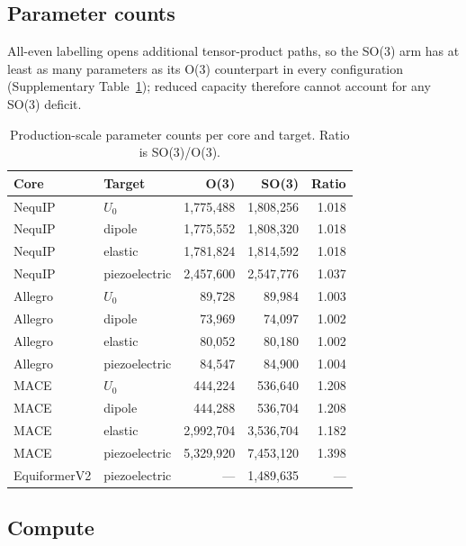 \subsection*{Parameter counts}

All-even labelling opens additional tensor-product paths, so the SO(3) arm has at least as many parameters as its O(3) counterpart in every configuration (Supplementary Table~\ref{stab:params}); reduced capacity therefore cannot account for any SO(3) deficit.

\begin{table}[htbp]
\centering
\caption{Production-scale parameter counts per core and target. Ratio is SO(3)/O(3).}
\label{stab:params}
\scriptsize
\begin{tabular}{llrrr}
\toprule
Core & Target & O(3) & SO(3) & Ratio \\
\midrule
NequIP & $U_0$ & 1{,}775{,}488 & 1{,}808{,}256 & 1.018 \\
NequIP & dipole & 1{,}775{,}552 & 1{,}808{,}320 & 1.018 \\
NequIP & elastic & 1{,}781{,}824 & 1{,}814{,}592 & 1.018 \\
NequIP & piezoelectric & 2{,}457{,}600 & 2{,}547{,}776 & 1.037 \\
Allegro & $U_0$ & 89{,}728 & 89{,}984 & 1.003 \\
Allegro & dipole & 73{,}969 & 74{,}097 & 1.002 \\
Allegro & elastic & 80{,}052 & 80{,}180 & 1.002 \\
Allegro & piezoelectric & 84{,}547 & 84{,}900 & 1.004 \\
MACE & $U_0$ & 444{,}224 & 536{,}640 & 1.208 \\
MACE & dipole & 444{,}288 & 536{,}704 & 1.208 \\
MACE & elastic & 2{,}992{,}704 & 3{,}536{,}704 & 1.182 \\
MACE & piezoelectric & 5{,}329{,}920 & 7{,}453{,}120 & 1.398 \\
EquiformerV2 & piezoelectric & --- & 1{,}489{,}635 & --- \\
\bottomrule
\end{tabular}
\end{table}

\subsection*{Compute}


